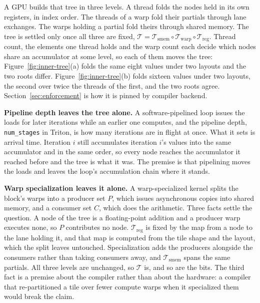 \documentclass[sigplan,nonacm]{acmart}
\begin{document}
A GPU builds that tree in three levels. A thread folds the nodes held in
its own registers, in index order. The threads of a warp fold their partials
through lane exchanges. The warps holding a partial fold theirs through shared
memory. The tree is settled only once all three are fixed,
$\mathcal{T} = \mathcal{T}_{\mathrm{smem}} \circ \mathcal{T}_{\mathrm{warp}}
\circ \mathcal{T}_{\mathrm{reg}}$.
Thread count, the elements one thread holds and the warp count each
decide which nodes share an accumulator at some level, so each of them moves
the tree: Figure~\ref{fig:inner-tree}(a) folds the same eight values under
two layouts and the two roots differ. 
Figure~\ref{fig:inner-tree}(b) folds sixteen values under two layouts, the
second over twice the threads of the first, and the two roots agree.
Section~\ref{sec:enforcement} is how it is pinned by compiler backend.

\textbf{Pipeline depth leaves the tree alone.} A software-pipelined loop
issues the loads for later iterations while an earlier one computes, and the
pipeline depth, \texttt{num\allowbreak \_stages} in Triton, is how many iterations are in
flight at once. What it sets is arrival time. Iteration $i$ still accumulates
iteration $i$'s values into the same accumulator and in the same order, so every
node reaches the accumulator it reached before and the tree is what it was. The
premise is that pipelining moves the loads and leaves the loop's accumulation
chain where it stands.




\textbf{Warp specialization leaves it alone.} A warp-specialized
kernel splits the block's warps into a producer set $P$, which issues
asynchronous copies into shared memory, and a consumer set $C$, which does the
arithmetic. Three facts settle the question. A node of the tree is a
floating-point addition and a producer warp executes none, so $P$ contributes no
node. $\mathcal{T}_{\mathrm{reg}}$ is fixed by the map from a node to the lane
holding it, and that map is computed from the tile shape and the layout, which
the split leaves untouched. Specialization adds the producers alongside the
consumers rather than taking consumers away, and $\mathcal{T}_{\mathrm{smem}}$ spans
the same partials. All three levels are unchanged, so $\mathcal{T}$ is, and so
are the bits. The third fact is a premise about the compiler rather than about
the hardware: a compiler that re-partitioned a tile over fewer compute warps
when it specialized them would break the claim.
\end{document}
